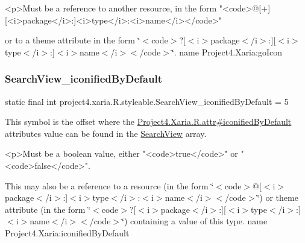 \begin{DoxyVerb}      <p>Must be a reference to another resource, in the form "<code>@[+][<i>package</i>:]<i>type</i>:<i>name</i></code>"
\end{DoxyVerb}
 or to a theme attribute in the form \char`\"{}$<$code$>$?\mbox{[}$<$i$>$package$<$/i$>$\+:\mbox{]}\mbox{[}$<$i$>$type$<$/i$>$\+:\mbox{]}$<$i$>$name$<$/i$>$$<$/code$>$\char`\"{}.  name Project4.\+Xaria\+:go\+Icon \mbox{\label{classproject4_1_1xaria_1_1R_1_1styleable_a4ef3397cc9442515802ffefa9ec8123e}} 
\subsubsection{\texorpdfstring{Search\+View\+\_\+iconified\+By\+Default}{SearchView\_iconifiedByDefault}}
{\footnotesize\ttfamily static final int project4.\+xaria.\+R.\+styleable.\+Search\+View\+\_\+iconified\+By\+Default = 5\hspace{0.3cm}{\ttfamily [static]}}

This symbol is the offset where the \hyperlink{}{Project4.\+Xaria.\+R.\+attr\#iconified\+By\+Default} attribute\textquotesingle{}s value can be found in the \hyperlink{classproject4_1_1xaria_1_1R_1_1styleable_a6308d960f6e1e05e5316efa4904fedfc}{Search\+View} array.

\begin{DoxyVerb}      <p>Must be a boolean value, either "<code>true</code>" or "<code>false</code>".
\end{DoxyVerb}
 

This may also be a reference to a resource (in the form \char`\"{}$<$code$>$@\mbox{[}$<$i$>$package$<$/i$>$\+:\mbox{]}$<$i$>$type$<$/i$>$\+:$<$i$>$name$<$/i$>$$<$/code$>$\char`\"{}) or theme attribute (in the form \char`\"{}$<$code$>$?\mbox{[}$<$i$>$package$<$/i$>$\+:\mbox{]}\mbox{[}$<$i$>$type$<$/i$>$\+:\mbox{]}$<$i$>$name$<$/i$>$$<$/code$>$\char`\"{}) containing a value of this type.  name Project4.\+Xaria\+:iconified\+By\+Default \mbox{\label{classproject4_1_1xaria_1_1R_1_1styleable_a3779c51813ae088ff27ef4c0c40ba410}} 
